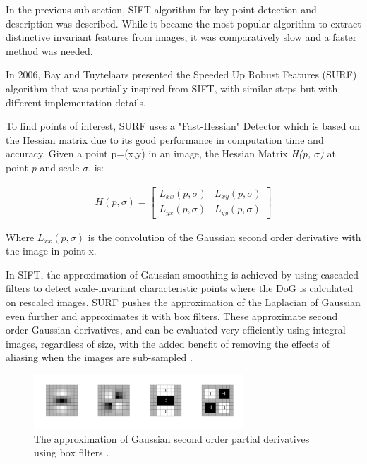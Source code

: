 \documentclass{l4proj}
\begin{document}
In the previous sub-section, SIFT algorithm for key point detection and description was described. While it became the most popular algorithm to extract distinctive invariant features from images, it was comparatively slow and a faster method was needed.

In 2006, Bay and Tuytelaars presented the Speeded Up Robust Features (SURF) algorithm that was partially inspired from SIFT, with similar steps but with different implementation details. 

To find points of interest, SURF uses a "Fast-Hessian" Detector which is based on the Hessian matrix due to its good performance in computation time and accuracy. Given a point p=(x,y) in an image, the Hessian Matrix \textit{H(p, $\sigma$)} at point \textit{p} and scale \textit{$\sigma$}, is: 

\begin{align}
 H(p,\sigma) = \begin{bmatrix}L_{xx}(p, \sigma) &L_{xy}(p, \sigma)  \\L_{yx}(p, \sigma) & L_{yy}(p, \sigma) \end{bmatrix}
\end{align}


Where $L_{xx}(p, \sigma)$ is the convolution of the Gaussian second order derivative with the image in point x. 

In SIFT, the approximation of Gaussian smoothing is achieved by using cascaded filters to detect scale-invariant characteristic points where the DoG is calculated on rescaled images. SURF pushes the approximation of the Laplacian of Gaussian even further and approximates it with box filters. These approximate second order Gaussian derivatives, and can be evaluated very efficiently using integral images, regardless of size, with the added benefit of removing the effects of aliasing when the images are sub-sampled \citep{Bay08}.





\begin{figure}[ht]
    \centering
    \includegraphics[width=0.7\textwidth]{l4template-master/images/boxfilters.png}
    \caption{The approximation of Gaussian second order partial derivatives using box filters \citep{Bay08}.}
    \label{boxfilters}
\end{figure}
\end{document}
